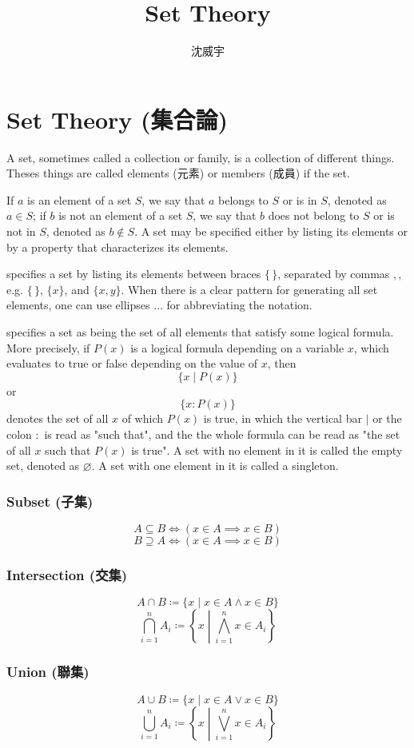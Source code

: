 \documentclass[a4paper,12pt]{article}
\begin{document}
\title{Set Theory}
\author{沈威宇}
\date{\temtoday}
\titletocdoc
\section{Set Theory (集合論)}
A set, sometimes called a collection or family, is a collection of different things. Theses things are called elements (元素) or members (成員) if the set.

If $a$ is an element of a set $S$, we say that $a$ belongs to $S$ or is in $S$, denoted as $a\in S$; if $b$ is not an element of a set $S$, we say that $b$ does not belong to $S$ or is not in $S$, denoted as $b\notin S$.
A set may be specified either by listing its elements or by a property that characterizes its elements.

 specifies a set by listing its elements between braces $\{\,\}$, separated by commas $,$, e.g. $\{\,\}$, $\{x\}$, and $\{x,y\}$. When there is a clear pattern for generating all set elements, one can use ellipses $\ldots$ for abbreviating the notation.

 specifies a set as being the set of all elements that satisfy some logical formula. More precisely, if $P(x)$ is a logical formula depending on a variable ⁠$x$, which evaluates to true or false depending on the value of $x$, then
\[\{x\mid P(x)\}\]
or
\[\{x\colon P(x)\}\]
denotes the set of all $x$ of which $P(x)$ is true, in which the vertical bar $\mid$ or the colon $\colon$ is read as "such that", and the the whole formula can be read as "the set of all $x$ such that $P(x)$ is true".
A set with no element in it is called the empty set, denoted as $\varnothing$. A set with one element in it is called a singleton.
\subsubsection{Subset (子集)}
\[A\subseteq B\iff (x\in A\implies x\in B)\]
\[B\supseteq A\iff (x\in A\implies x\in B)\]
\subsubsection{Intersection (交集)}
\[A\cap B\coloneq\{x\mid x\in A \land x\in B\}\]
\[\bigcap_{i=1}^n A_i\coloneq\left\{x\middle | \bigwedge_{i=1}^n x\in A_i\right\}\]
\subsubsection{Union (聯集)}
\[A\cup B\coloneq\{x\mid x\in A \lor x\in B\}\]
\[\bigcup_{i=1}^n A_i\coloneq\left\{x\middle | \bigvee_{i=1}^n x\in A_i\right\}\]
\end{document}
